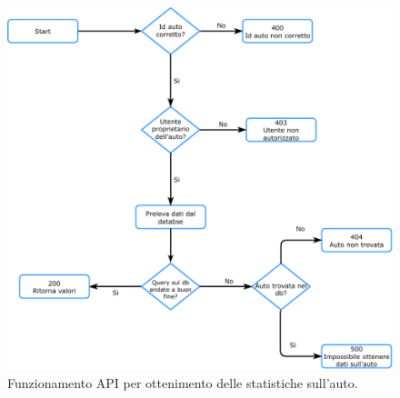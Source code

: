 \documentclass[italian, Lau, oneside, nodefaultfont, noexaminfo]{sapthesis}
\begin{document}
\begin{center}
\begin{figure}[H]
    \includegraphics[width=\textwidth]{figure/car-statistics-flow-chart.pdf}
    \caption{Funzionamento API per ottenimento delle statistiche sull'auto.}
    \label{fig:statistiche-auto}
\end{figure}
\end{center}


\end{document}
